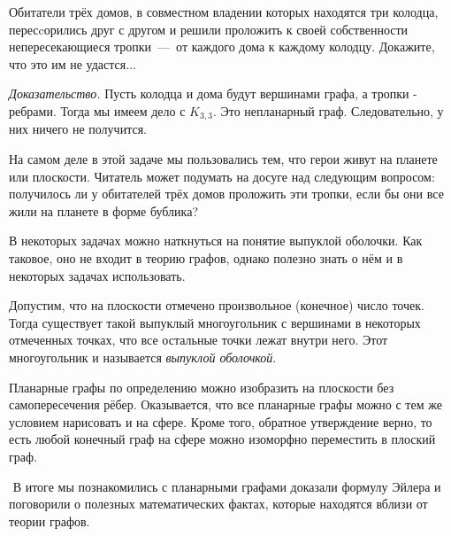 \begin{example}
	Обитатели трёх домов, в совместном владении которых находятся три колодца, пересcорились друг с другом и решили проложить к своей собственности непересекающиеся тропки~---~от каждого дома к каждому колодцу. Докажите, что это им не удастся...
	
	\emph{Доказательство.} Пусть колодца и дома будут вершинами графа, а тропки - ребрами. Тогда мы имеем дело с $K_{3, 3}$. Это непланарный граф. Следовательно, у них ничего не получится.
\end{example}

	На самом деле в этой задаче мы пользовались тем, что герои живут на планете или плоскости. Читатель может подумать на досуге над следующим вопросом: получилось ли у обитателей трёх домов проложить эти тропки, если бы они все жили на планете в форме бублика?
	

	В некоторых задачах можно наткнуться на понятие выпуклой оболочки. Как таковое, оно не входит в теорию графов, однако полезно знать о нём и в некоторых задачах использовать.
	
	Допустим, что на плоскости отмечено произвольное (конечное) число точек. Тогда существует такой выпуклый многоугольник с вершинами в некоторых отмеченных точках, что все остальные точки лежат внутри него. Этот многоугольник и называется \emph{выпуклой оболочкой}.
	
	Планарные графы по определению можно изобразить на плоскости без самопересечения рёбер. Оказывается, что все планарные графы можно с тем же условием нарисовать и на сфере. Кроме того, обратное утверждение верно, то есть любой конечный граф на сфере можно изоморфно переместить в плоский граф.

$ $
\newline
	В итоге мы познакомились с планарными графами доказали формулу Эйлера и поговорили о полезных математических фактах, которые находятся вблизи от теории графов.
	

